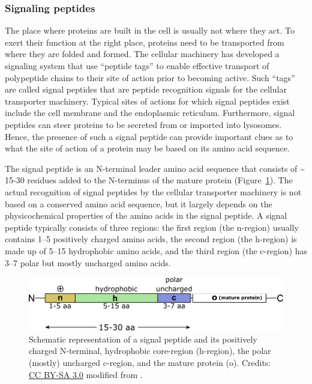 \subsubsection{Signaling peptides}

The place where proteins are built in the cell is usually not where they act.
To exert their function at the right place, proteins need to be transported from where they are folded and formed.
The cellular machinery has developed a signaling system that use ``peptide tags'' to enable effective transport of polypeptide chains to their site of action prior to becoming active.
Such ``tags'' are called signal peptides that are peptide recognition signals for the cellular transporter machinery.
Typical sites of actions for which signal peptides exist include the cell membrane and the endoplasmic reticulum.
Furthermore, signal peptides can steer proteins to be secreted from or imported into lysosomes.
Hence, the presence of such a signal peptide can provide important clues as to what the site of action of a protein may be based on its amino acid sequence.

The signal peptide is an N-terminal leader amino acid sequence that consists of {\textasciitilde} 15-30 residues added to the N-terminus of the mature protein (Figure~\ref{signal_peptide}).
The actual recognition of signal peptides by the cellular transporter machinery is not based on a conserved amino acid sequence, but it largely depends on the physicochemical properties of the amino acids in the signal peptide.
A signal peptide typically consists of three regions: the first region (the n-region) usually contains 1--5 positively charged amino acids, the second region (the h-region) is made up of 5--15 hydrophobic amino acids, and the third region (the c-region) has 3--7 polar but mostly uncharged amino acids.

\begin{figure}[!htbp]
\centering
\includegraphics[width=1\linewidth]{files/signal-peptide-d74bee926502fd20e8532d3c47864cb1.pdf}
\caption[]{Schematic representation of a signal peptide and its positively charged N-terminal, hydrophobic core-region (h-region), the polar (mostly) uncharged c-region, and the mature protein (o).
Credits: \href{https://creativecommons.org/licenses/by-sa/3.0/}{CC BY-SA 3.0} modified from \cite{signal_peptide_2010}.}
\label{signal_peptide}
\end{figure}


